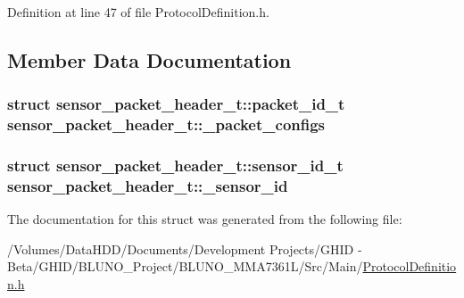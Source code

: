 \-Definition at line 47 of file \-Protocol\-Definition.\-h.



\subsection{\-Member \-Data \-Documentation}
\hypertarget{structsensor__packet__header__t_a4e5e38459edaa1955085958204b2ccfa}{
\subsubsection[{\-\_\-packet\-\_\-configs}]{\setlength{\rightskip}{0pt plus 5cm}struct {\bf sensor\-\_\-packet\-\_\-header\-\_\-t\-::packet\-\_\-id\-\_\-t}  {\bf sensor\-\_\-packet\-\_\-header\-\_\-t\-::\-\_\-packet\-\_\-configs}}}\label{structsensor__packet__header__t_a4e5e38459edaa1955085958204b2ccfa}
\hypertarget{structsensor__packet__header__t_afcdc03dc84384733134e6334eb9aad2b}{
\subsubsection[{\-\_\-sensor\-\_\-id}]{\setlength{\rightskip}{0pt plus 5cm}struct {\bf sensor\-\_\-packet\-\_\-header\-\_\-t\-::sensor\-\_\-id\-\_\-t}  {\bf sensor\-\_\-packet\-\_\-header\-\_\-t\-::\-\_\-sensor\-\_\-id}}}\label{structsensor__packet__header__t_afcdc03dc84384733134e6334eb9aad2b}


\-The documentation for this struct was generated from the following file\-:\begin{DoxyCompactItemize}
\item 
/\-Volumes/\-Data\-H\-D\-D/\-Documents/\-Development Projects/\-G\-H\-I\-D -\/ Beta/\-G\-H\-I\-D/\-B\-L\-U\-N\-O\-\_\-\-Project/\-B\-L\-U\-N\-O\-\_\-\-M\-M\-A7361\-L/\-Src/\-Main/\hyperlink{_protocol_definition_8h}{\-Protocol\-Definition.\-h}\end{DoxyCompactItemize}
